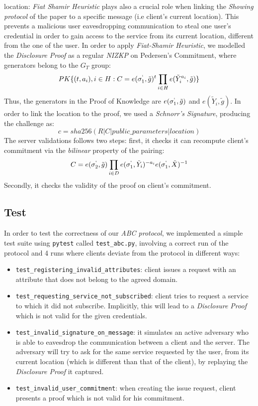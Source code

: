 \documentclass[10pt,conference,compsocconf]{IEEEtran}
\begin{document}
\begin{itemize}
{    location}: \textit{Fiat Shamir Heuristic} plays also a crucial role when
    linking the \textit{Showing protocol} of the paper to a specific message
    (i.e client's current location). This prevents a malicious user
    eavesdropping communication to steal one user's credential in order to gain
    access to the service from its current location, different from the one of the user. In order to apply
    \textit{Fiat-Shamir Heuristic}, we modelled the \textit{Disclosure Proof} as
    a regular \textit{NIZKP} on Pedersen's Commitment, where generators belong
    to the $G_T$ group: \[PK\{(t,a_i), i \in H : C=e(\sigma_{1}^{`},
    \tilde{g})^t\prod_{i \in H}e(\tilde{Y}_{i}^{a_i},\tilde{g})\}\]
    Thus, the generators in the Proof of Knowledge are $e(\sigma_{1}^{`}, \tilde{g})$ and
    $e(\tilde{Y}_{i},\tilde{g})$. In order to link the location to the
    proof, we used a \textit{Schnorr's Signature}, producing the challenge as:
    \[c = sha256(R|C|public\_parameters|location)\]
    The server validations follows two steps: first, it checks it can recompute client's commitment via
    the \textit{bilinear} property of the pairing:
    \[C = e(\sigma_2^`,\tilde{g})\prod_{i \in
    D}e(\sigma_1^`,\tilde{Y}_i)^{-a_i}e(\sigma_1^`,\tilde{X})^{-1}\] Secondly,
    it checks the validity of the proof on client's commitment.
\end{itemize}
\subsection{Test}
In order to test the correctness of our \textit{ABC protocol}, we implemented a
simple test suite using \texttt{pytest} called \texttt{test\_abc.py}, involving
a correct run of the protocol and 4 runs where clients deviate from the
protocol in different ways:
\begin{itemize}
    \item \texttt{test\_registering\_invalid\_attributes}: client issues a
    request with an attribute that does not belong to the agreed domain.
    \item \texttt{test\_requesting\_service\_not\_subscribed}: client tries to
    request a service to which it did not subscribe. Implicitly, this will lead
    to a \textit{Disclosure Proof} which is not valid for the given credentials.
    \item \texttt{test\_invalid\_signature\_on\_message}: it simulates an active
    adversary who is able to eavesdrop the communication between a client and
    the server. The adversary will try to ask for the same service requested by the user, from its current location (which is different than that of the client), by
    replaying the \textit{Disclosure Proof} it captured.
    \item \texttt{test\_invalid\_user\_commitment}: when creating the issue
    request, client presents a proof which is not valid for his commitment.
\end{itemize}
\end{document}
